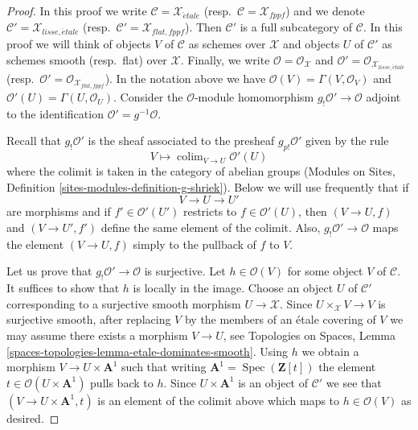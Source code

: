 \documentclass[10pt,a4paper]{amsart}
\theoremstyle{plain}
\theoremstyle{definition}
\theoremstyle{remark}
\numberwithin{equation}{subsection}
\def\colim{\mathop{\mathrm{colim}}\nolimits}
\def\Spec{\mathop{\mathrm{Spec}}}
\def\etale{{\acute{e}tale}}
\begin{document}
\begin{proof}
In this proof we write
$\mathcal{C} = \mathcal{X}_\etale$
(resp.\ $\mathcal{C} = \mathcal{X}_{fppf}$)
and we denote
$\mathcal{C}' = \mathcal{X}_{lisse,\etale}$
(resp.\ $\mathcal{C}' = \mathcal{X}_{flat, fppf}$).
Then $\mathcal{C}'$ is a full subcategory of $\mathcal{C}$.
In this proof we will think of objects $V$ of $\mathcal{C}$
as schemes over $\mathcal{X}$ and objects $U$ of $\mathcal{C}'$
as schemes smooth (resp.\ flat) over $\mathcal{X}$.
Finally, we write $\mathcal{O} = \mathcal{O}_\mathcal{X}$
and $\mathcal{O}' = \mathcal{O}_{\mathcal{X}_{lisse,\etale}}$
(resp.\ $\mathcal{O}' = \mathcal{O}_{\mathcal{X}_{flat,fppf}}$).
In the notation above we have $\mathcal{O}(V) = \Gamma(V, \mathcal{O}_V)$
and $\mathcal{O}'(U) = \Gamma(U, \mathcal{O}_U)$.
Consider the $\mathcal{O}$-module homomorphism
$g_!\mathcal{O}' \to \mathcal{O}$
adjoint to the identification $\mathcal{O}' = g^{-1}\mathcal{O}$.

\medskip\noindent
Recall that $g_!\mathcal{O}'$ is the sheaf associated to the presheaf
$g_{p!}\mathcal{O}'$ given by the rule
$$
V \longmapsto \colim_{V \to U} \mathcal{O}'(U)
$$
where the colimit is taken in the category of abelian groups
(Modules on Sites, Definition \ref{sites-modules-definition-g-shriek}).
Below we will use frequently that if
$$
V \to U \to U'
$$
are morphisms and if $f' \in \mathcal{O}'(U')$ restricts to
$f \in \mathcal{O}'(U)$, then $(V \to U, f)$ and $(V \to U', f')$
define the same element of the colimit. Also,
$g_!\mathcal{O}' \to \mathcal{O}$ maps the element
$(V \to U, f)$ simply to the pullback of $f$ to $V$.

\medskip\noindent
Let us prove that $g_!\mathcal{O}' \to \mathcal{O}$ is surjective.
Let $h \in \mathcal{O}(V)$ for some object $V$ of $\mathcal{C}$.
It suffices to show that $h$ is locally in the image. Choose an object
$U$ of $\mathcal{C}'$ corresponding to a surjective smooth morphism
$U \to \mathcal{X}$. Since $U \times_\mathcal{X} V \to V$ is surjective
smooth, after replacing $V$ by the members of an \'etale covering of $V$
we may assume there exists a morphism $V \to U$, see
Topologies on Spaces, Lemma
\ref{spaces-topologies-lemma-etale-dominates-smooth}. Using $h$ we obtain
a morphism $V \to U \times \mathbf{A}^1$ such that writing
$\mathbf{A}^1 = \Spec(\mathbf{Z}[t])$ the element
$t \in \mathcal{O}(U \times \mathbf{A}^1)$ pulls back to $h$.
Since $U \times \mathbf{A}^1$ is an object of $\mathcal{C}'$
we see that $(V \to U \times \mathbf{A}^1, t)$
is an element of the colimit above which maps to $h \in \mathcal{O}(V)$
as desired.


\end{proof}
\end{document}
